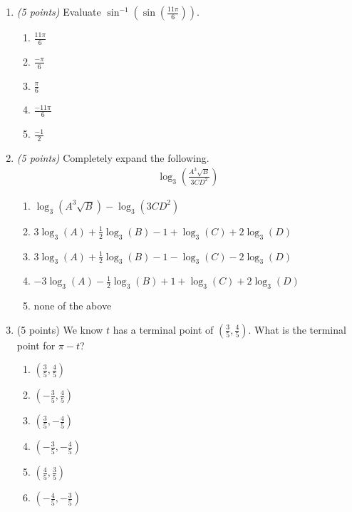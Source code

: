 \documentclass[fleqn]{article}
\renewcommand{\thispagestyle}[1]{}
\begin{document}
\begin{enumerate}
\vspace{0.3in}

\item \textit{(5 points)} Evaluate $\displaystyle \sin^{-1}\left(\sin\left( \frac{11\pi}{6} \right) \right)$.
\begin{multicols}{3}
\begin{enumerate}
\item $\displaystyle \frac{11\pi}{6}$
\item $\displaystyle \frac{-\pi}{6}$
\item $\displaystyle \frac{\pi}{6}$
\item $\displaystyle \frac{-11\pi}{6}$
\item $\displaystyle \frac{-1}{2}$
\end{enumerate} 
\end{multicols}

\vspace{0.3in}

\item \textit{(5 points)} Completely expand the following.
\begin{align*}
\log_3 \left( \frac{A^3 \sqrt{B}}{3CD^2} \right)
\end{align*}
\begin{enumerate}
\item $\log_3(A^3\sqrt{B}) - \log_3(3CD^2)$
\item $3\log_3(A) + \frac{1}{2}\log_3(B) - 1 + \log_3(C) + 2\log_3(D)$
\item $3\log_3(A) + \frac{1}{2}\log_3(B) - 1 - \log_3(C) - 2\log_3(D)$
\item $-3\log_3(A) - \frac{1}{2}\log_3(B) + 1 + \log_3(C) + 2\log_3(D)$
\item none of the above
\end{enumerate}

\vspace{0.3in}

\pagebreak
\thispagestyle{fancy}{
\lhead{}
}

\item (5 points) We know $t$ has a terminal point of $(\frac{3}{5},\frac{4}{5})$.  What is the terminal point for $\pi - t$?

\begin{multicols}{4}
\begin{enumerate}
\item $(\frac{3}{5},\frac{4}{5})$
\item $(-\frac{3}{5},\frac{4}{5})$
\item $(\frac{3}{5},-\frac{4}{5})$
\item $(-\frac{3}{5},-\frac{4}{5})$
\item $(\frac{4}{5},\frac{3}{5})$
\item $(-\frac{4}{5},-\frac{3}{5})$
\end{enumerate}
\end{multicols}


\end{enumerate}
\end{document}
